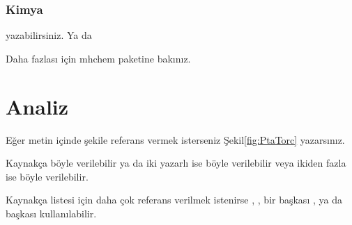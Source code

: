 \subsubsection{Kimya}
 yazabilirsiniz. Ya da


Daha fazlası için mhchem paketine bakınız.
 
\section{Analiz}
Eğer metin içinde şekile referans vermek isterseniz Şekil\ref{fig:PtaTorc} yazarsınız. 

Kaynakça böyle verilebilir \parencite{celik_microstructure_2013} ya da iki yazarlı ise böyle verilebilir \parencite{gatto_plasma_2004} veya ikiden fazla ise böyle verilebilir.
\parencite{celik_effects_2011}

Kaynakça listesi için daha çok referans verilmek istenirse \parencite{yazdi_microstructure_2015, keehan_influence_2006, guo_microstructure_2014}, \parencite{kim_variation_2013}, bir başkası \parencite{xibao_metallurgical_2005},  ya da başkası \parencite{jin_effect_1997} kullanılabilir.
